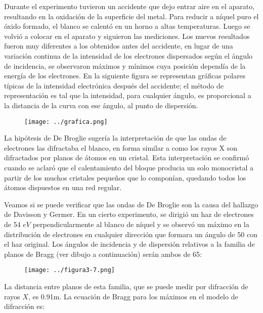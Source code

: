 \documentclass[a4paper]{article}
\begin{document}
    \indent Durante el experimento tuvieron un accidente que dejo entrar aire en el aparato, resultando en la oxidación de la superficie del metal. Para reducir a níquel puro el óxido formado, el blanco se calentó en un horno a altas temperaturas. Luego se volvió a colocar en el aparato y siguieron las mediciones. Los nuevos resultados fueron muy diferentes a los obtenidos antes del accidente, en lugar de una variación continua de la intensidad de los electrones dispersados según el ángulo de incidencia, se observaron máximos y mínimos cuya posición dependía de la energía de los electrones. En la siguiente figura se representan gráficas polares típicas de la intensidad electrónica después del accidente; el método de representación es tal que la intensidad, para cualquier ángulo, es proporcional a la distancia de la curva con ese ángulo, al punto de dispersión.

    \begin{figure}[h!]
        \centering
        \texttt{[image: ../grafica.png]}
    \end{figure}

    \indent La hipótesis de De Broglie sugería la interpretación de que las ondas de electrones las difractaba el blanco, en forma similar a como los rayos X son difractados por planos de átomos en un cristal. Esta interpretación se confirmó cuando se aclaró que el calentamiento del bloque producia un solo monocristal a partir de los muchos cristales pequeños que lo componían, quedando todos los átomos dispuestos en una red regular.

    \indent Veamos si se puede verificar que las ondas de De Broglie son la causa del hallazgo de Davisson y Germer. En un cierto experimento, se dirigió un haz de electrones de 54 $eV$ perpendicularmente al blanco de níquel y se observó un máximo en la distribución de electrones en cualquier dirección que formara un ángulo de {50\textdegree} con el haz original. Los ángulos de incidencia y de dispersión relativos a la familia de planos de Bragg (ver dibujo a continuación) serán ambos de {65\textdegree}:

    \begin{figure}[h!]
        \centering
        \texttt{[image: ../figura3-7.png]}
    \end{figure}

    \newpage
    \noindent
    \thispagestyle{fancy}

    \indent La distancia entre planos de esta familia, que se puede medir por difracción de rayos $X$, es 0.91m. La ecuación de Bragg para los máximos en el modelo de difracción es: 
\end{document}
